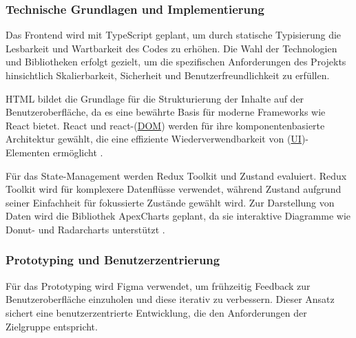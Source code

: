 \subsubsection*{Technische Grundlagen und Implementierung} Das Frontend wird mit TypeScript geplant, um durch statische Typisierung die Lesbarkeit und Wartbarkeit des Codes zu erhöhen. Die Wahl der Technologien und Bibliotheken erfolgt gezielt, um die spezifischen Anforderungen des Projekts hinsichtlich Skalierbarkeit, Sicherheit und Benutzerfreundlichkeit zu erfüllen.

HTML bildet die Grundlage für die Strukturierung der Inhalte auf der Benutzeroberfläche, da es eine bewährte Basis für moderne Frameworks wie React bietet. React und react-(\hyperref[abkuerzungen]{DOM}) werden für ihre komponentenbasierte Architektur gewählt, die eine effiziente Wiederverwendbarkeit von (\hyperref[abkuerzungen]{UI})-Elementen ermöglicht \cite{facebook2021react}.

Für das State-Management werden Redux Toolkit und Zustand evaluiert. Redux Toolkit wird für komplexere Datenflüsse verwendet, während Zustand aufgrund seiner Einfachheit für fokussierte Zustände gewählt wird. Zur Darstellung von Daten wird die Bibliothek ApexCharts geplant, da sie interaktive Diagramme wie Donut- und Radarcharts unterstützt \cite{apexchartsDoc}.

\subsubsection*{Prototyping und Benutzerzentrierung} Für das Prototyping wird Figma verwendet, um frühzeitig Feedback zur Benutzeroberfläche einzuholen und diese iterativ zu verbessern. Dieser Ansatz sichert eine benutzerzentrierte Entwicklung, die den Anforderungen der Zielgruppe entspricht.


